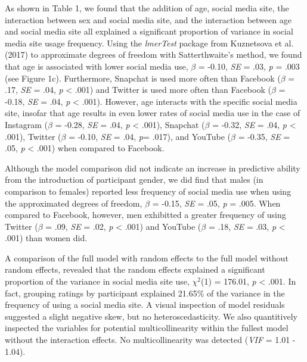 \documentclass[man, fleqn, noextraspace]{apa6}
\theoremstyle{definition}
\theoremstyle{definition}
\theoremstyle{definition}
\theoremstyle{remark}
\begin{document}
As shown in Table 1, we found that the addition of age, social media
site, the interaction between sex and social media site, and the
interaction between age and social media site all explained a
significant proportion of variance in social media site usage frequency.
Using the \emph{lmerTest} package from Kuznetsova et al. (2017) to
approximate degrees of freedom with Satterthwaite's method, we found
that age is associated with lower social media use, \(\beta\) = -0.10,
\emph{SE} = .03, \emph{p} = .003 (see Figure 1c). Furthermore, Snapchat
is used more often than Facebook (\(\beta\) = .17, \emph{SE} = .04,
\emph{p} \textless{} .001) and Twitter is used more often than Facebook
(\(\beta\) = -0.18, \emph{SE} = .04, \emph{p} \textless{} .001).
However, age interacts with the specific social media site, insofar that
age results in even lower rates of social media use in the case of
Instagram (\(\beta\) = -0.28, \emph{SE} = .04, \emph{p} \textless{}
.001), Snapchat (\(\beta\) = -0.32, \emph{SE} = .04, \emph{p}
\textless{} .001), Twitter (\(\beta\) = -0.10, \emph{SE} = .04,
\emph{p}= .017), and YouTube (\(\beta\) = -0.35, \emph{SE} = .05,
\emph{p} \textless{} .001) when compared to Facebook.

Although the model comparison did not indicate an increase in predictive
ability from the introduction of participant gender, we did find that
males (in comparison to females) reported less frequency of social media
use when using the approximated degrees of freedom, \(\beta\) = -0.15,
\emph{SE} = .05, \emph{p} = .005. When compared to Facebook, however,
men exhibitted a greater frequency of using Twitter (\(\beta\) = .09,
\emph{SE} = .02, \emph{p} \textless{} .001) and YouTube (\(\beta\) =
.18, \emph{SE} = .03, \emph{p} \textless{} .001) than women did.

A comparison of the full model with random effects to the full model
without random effects, revealed that the random effects explained a
significant proportion of the variance in social media site use,
\(\chi^2\)(1) = 176.01, \emph{p} \textless{} .001. In fact, grouping
ratings by participant explained 21.65\% of the variance in the
frequency of using a social media site. A visual inspection of model
residuals suggested a slight negative skew, but no heteroscedasticity.
We also quantitively inspected the variables for potential
multicollinearity within the fullest model without the interaction
effects. No multicollinearity was detected (\emph{VIF} = 1.01 - 1.04).
\end{document}
